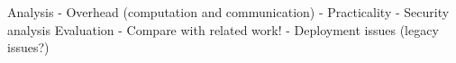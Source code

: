 Analysis
- Overhead (computation and communication)
- Practicality
- Security analysis
Evaluation
- Compare with related work!
- Deployment issues (legacy issues?)

